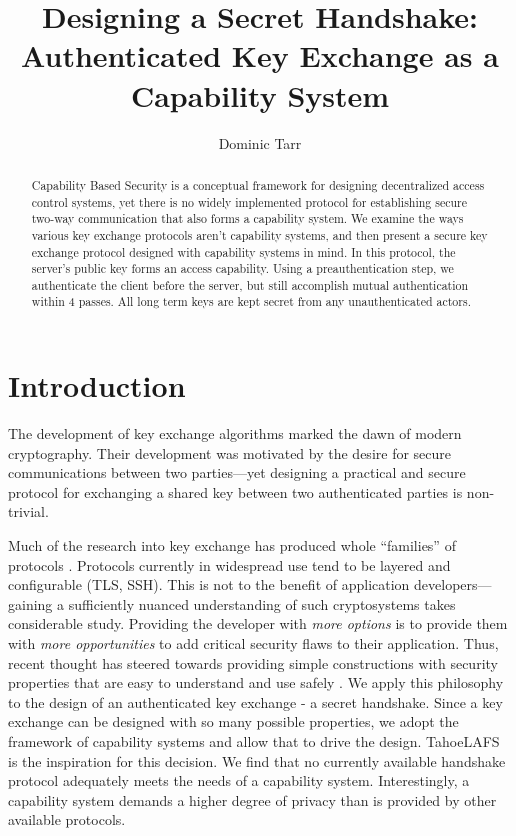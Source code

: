 \documentclass[12pt]{article}
\begin{document}
\title{Designing a Secret Handshake: Authenticated Key Exchange as a Capability System}
\author{Dominic Tarr}


\maketitle

\begin{abstract}
Capability Based Security is a conceptual framework for designing
decentralized access control systems, yet there is no widely
implemented protocol for establishing secure two-way communication
that also forms a capability system.
We examine the ways various key exchange protocols aren't
capability systems, and then present a secure key
exchange protocol designed with capability systems in mind.
In this protocol, the server's public key forms an access capability.
Using a preauthentication step, we authenticate the client before
the server, but still accomplish mutual authentication within 4 passes.
All long term keys are kept secret from any unauthenticated actors.

\end{abstract}

\section{Introduction}

The development of key exchange algorithms marked the dawn of
modern cryptography\cite{ndic}. Their development was motivated
by the desire for secure communications between two parties---yet
designing a practical and secure protocol for exchanging
a shared key between two authenticated parties is non-trivial\cite{aake}.

Much of the research into key exchange has produced whole ``families'' of
protocols \cite{sigma}. Protocols currently in widespread
use tend to be layered and configurable (TLS, SSH). This is not
to the benefit of application developers---gaining a sufficiently
nuanced understanding of such cryptosystems takes considerable study.
Providing the developer with \emph{more options} is to provide them
with \emph{more opportunities} to add critical security flaws to their
application. Thus, recent thought has steered towards providing simple constructions
with security properties that are easy to understand and use safely
\cite{nacl}. We apply this philosophy to the design of an authenticated
key exchange - a secret handshake. Since a key exchange can be designed
with so many possible properties, we adopt the framework of capability
systems\cite{unicap} and allow that to drive the design.
TahoeLAFS\cite{tahoe} is the inspiration for this decision.
We find that no currently available handshake protocol adequately meets
the needs of a capability system. Interestingly, a capability system
demands a higher degree of privacy than is provided by other available
protocols.
\end{document}

